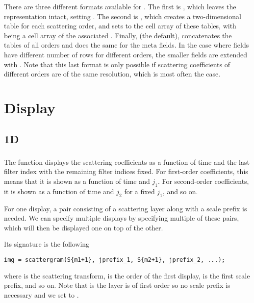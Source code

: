 \documentclass[twocolumn]{article}
\begin{document}
There are three different formats available for . The first is , which leaves the representation intact, setting . The second is , which creates a two-dimensional table for each scattering order, and sets  to the cell array of these tables, with  being a cell array of the associated . Finally,  (the default), concatenates the tables of all orders and does the same for the meta fields. In the case where  fields have different number of rows for different orders, the smaller fields are extended with . Note that this last format is only possible if scattering coefficients of different orders are of the same resolution, which is most often the case.

\section{Display}

\subsection{1D}

\subsubsection{}

The  function displays the scattering coefficients as a function of time and the last filter index with the remaining filter indices fixed. For first-order coefficients, this means that it is shown as a function of time and $j_1$. For second-order coefficients, it is shown as a function of time and $j_2$ for a fixed $j_1$, and so on.

For one display, a pair consisting of a scattering layer along with a scale prefix is needed. We can specify multiple displays by specifying multiple of these pairs, which will then be displayed one on top of the other.

Its signature is the following
\begin{lstlisting}
img = scattergram(S{m1+1}, jprefix_1, S{m2+1}, jprefix_2, ...);
\end{lstlisting}
where  is the scattering transform,  is the order of the first display,  is the first scale prefix, and so on. Note that is  the layer is of first order so no scale prefix is necessary and we set  to \mcode{[]}.
\end{document}
